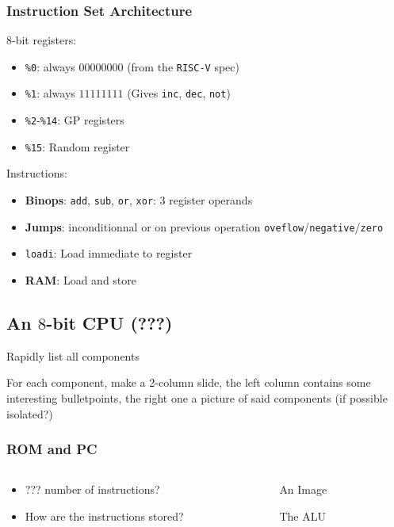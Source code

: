 \documentclass[aspectratio=169]{beamer}
\newcommand{\rv}{\texttt{RISC-V}}
\newcommand{\vrv}{\texttt{V-\rv}}
\begin{document}
\begin{frame}
	\frametitle{Instruction Set Architecture}

	$8$-bit registers:

	\begin{itemize}
		\item \texttt{\%0}: always $00000000$ (from the \rv{} spec)
		\item \texttt{\%1}: always $11111111$ (Gives \texttt{inc},
		      \texttt{dec}, \texttt{not})
		\item \texttt{\%2}-\texttt{\%14}: GP registers
		\item \texttt{\%15}: Random register
	\end{itemize}

	\pause

	Instructions:
	\begin{itemize}
		\item \textbf{Binops}: \texttt{add}, \texttt{sub}, \texttt{or},
		      \texttt{xor}: $3$ register operands
		\item \textbf{Jumps}: inconditionnal or on previous operation
		      \texttt{oveflow}/\texttt{negative}/\texttt{zero}
		\item \texttt{loadi}: Load immediate to register
		\item \textbf{RAM}: Load and store
	\end{itemize}
\end{frame}

\subsection{An $8$-bit CPU (???)}
\begin{frame}
	Rapidly list all components

	For each component, make a 2-column slide, the left column contains some
	interesting bulletpoints, the right one a picture of said components (if
	possible isolated?)
\end{frame}

\begin{frame}
	\frametitle{ROM and PC}
	\begin{columns}
		\begin{column}{0.5\textwidth}
			\begin{itemize}
				\item ??? number of instructions?
				\item How are the instructions stored?
			\end{itemize}
		\end{column}
		\begin{column}{0.5\textwidth}
			\begin{figure}
				An Image
				\caption*{The ALU}
			\end{figure}
		\end{column}
	\end{columns}
\end{frame}
\end{document}
